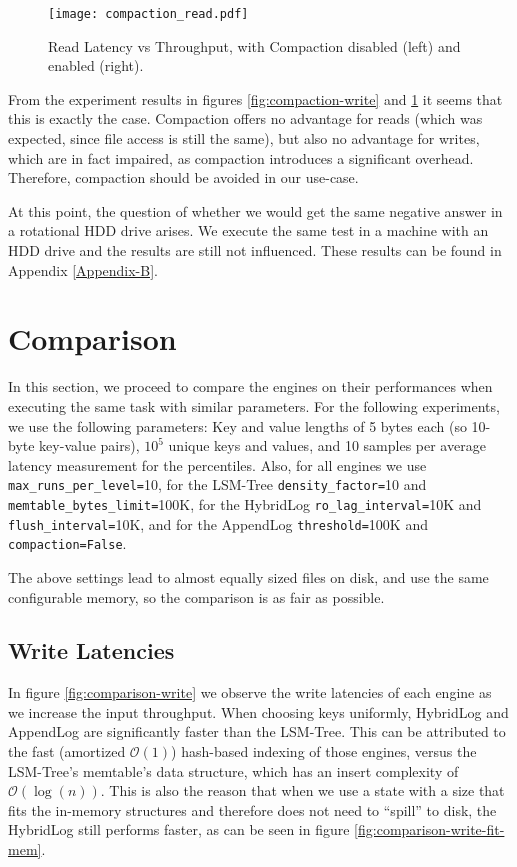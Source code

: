 \begin{figure}[h]
    \centering
    \texttt{[image: compaction\_read.pdf]}
    \caption{Read Latency vs Throughput, with Compaction disabled (left) and enabled (right).}
    \label{fig:compaction_read}
\end{figure}

From the experiment results in figures \ref{fig:compaction-write} and \ref{fig:compaction_read} it seems that this is exactly the case. Compaction offers no advantage for reads (which was expected, since file access is still the same), but also no advantage for writes, which are in fact impaired, as compaction introduces a significant overhead. Therefore, compaction should be avoided in our use-case.

At this point, the question of whether we would get the same negative answer in a rotational HDD drive arises. We execute the same test in a machine with an HDD drive and the results are still not influenced. These results can be found in Appendix \ref{Appendix-B}.

\section{Comparison}

In this section, we proceed to compare the engines on their performances when executing the same task with similar parameters. For the following experiments, we use the following parameters: Key and value lengths of 5 bytes each (so 10-byte key-value pairs), $10^5$ unique keys and values, and 10 samples per average latency measurement for the percentiles. Also, for all engines we use \verb"max_runs_per_level="10, for the LSM-Tree \verb"density_factor="10 and \verb"memtable_bytes_limit="100K, for the HybridLog \verb"ro_lag_interval="10K and \verb"flush_interval="10K, and for the AppendLog \verb"threshold="100K and \verb|compaction=False|.

The above settings lead to almost equally sized files on disk, and use the same configurable memory, so the comparison is as fair as possible.

\subsection{Write Latencies}

In figure \ref{fig:comparison-write} we observe the write latencies of each engine as we increase the input throughput. When choosing keys uniformly, HybridLog and AppendLog are significantly faster than the LSM-Tree. This can be attributed to the fast (amortized $\mathcal{O}(1)$) hash-based indexing of those engines, versus the LSM-Tree's memtable's data structure, which has an insert complexity of $\mathcal{O}(\log{}(n))$. This is also the reason that when we use a state with a size that fits the in-memory structures and therefore does not need to ``spill'' to disk, the HybridLog still performs faster, as can be seen in figure \ref{fig:comparison-write-fit-mem}.

